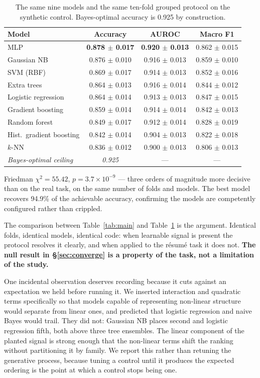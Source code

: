 \documentclass[11pt]{article}                      %
\newcommand{\tabfont}{\footnotesize}
\begin{document}
\begin{table}[t]
\centering\tabfont
\caption{The same nine models and the same ten-fold grouped protocol on the
synthetic control. Bayes-optimal accuracy is 0.925 by construction.}
\label{tab:synth}
\begin{tabular}{lccc}
\toprule
Model & Accuracy & AUROC & Macro F1 \\
\midrule
MLP                      & \textbf{0.878 $\pm$ 0.017} & \textbf{0.920 $\pm$ 0.013} & 0.862 $\pm$ 0.015 \\
Gaussian NB              & 0.876 $\pm$ 0.010 & 0.916 $\pm$ 0.013 & 0.859 $\pm$ 0.010 \\
SVM (RBF)                & 0.869 $\pm$ 0.017 & 0.914 $\pm$ 0.013 & 0.852 $\pm$ 0.016 \\
Extra trees              & 0.864 $\pm$ 0.013 & 0.916 $\pm$ 0.014 & 0.844 $\pm$ 0.012 \\
Logistic regression      & 0.864 $\pm$ 0.014 & 0.913 $\pm$ 0.013 & 0.847 $\pm$ 0.015 \\
Gradient boosting        & 0.859 $\pm$ 0.014 & 0.914 $\pm$ 0.014 & 0.842 $\pm$ 0.013 \\
Random forest            & 0.849 $\pm$ 0.017 & 0.912 $\pm$ 0.014 & 0.828 $\pm$ 0.019 \\
Hist.\ gradient boosting & 0.842 $\pm$ 0.014 & 0.904 $\pm$ 0.013 & 0.822 $\pm$ 0.018 \\
$k$-NN                   & 0.836 $\pm$ 0.012 & 0.900 $\pm$ 0.013 & 0.806 $\pm$ 0.013 \\
\midrule
\textit{Bayes-optimal ceiling} & \textit{0.925} & --- & --- \\
\bottomrule
\end{tabular}
\end{table}

Friedman $\chi^2 = 55.42$, $p = 3.7 \times 10^{-9}$ --- three orders of magnitude
more decisive than on the real task, on the same number of folds and models. The
best model recovers 94.9\% of the achievable accuracy, confirming the models are
competently configured rather than crippled.

The comparison between Table~\ref{tab:main} and Table~\ref{tab:synth} is the
argument. Identical folds, identical models, identical code: when learnable
signal is present the protocol resolves it clearly, and when applied to the
résumé task it does not. \textbf{The null result in \S\ref{sec:converge} is a
property of the task, not a limitation of the study.}

One incidental observation deserves recording because it cuts against an
expectation we held before running it. We inserted interaction and quadratic
terms specifically so that models capable of representing non-linear structure
would separate from linear ones, and predicted that logistic regression and naive
Bayes would trail. They did not: Gaussian NB places second and logistic
regression fifth, both above three tree ensembles. The linear component of the
planted signal is strong enough that the non-linear terms shift the ranking
without partitioning it by family. We report this rather than retuning the
generative process, because tuning a control until it produces the expected
ordering is the point at which a control stops being one.
\end{document}
